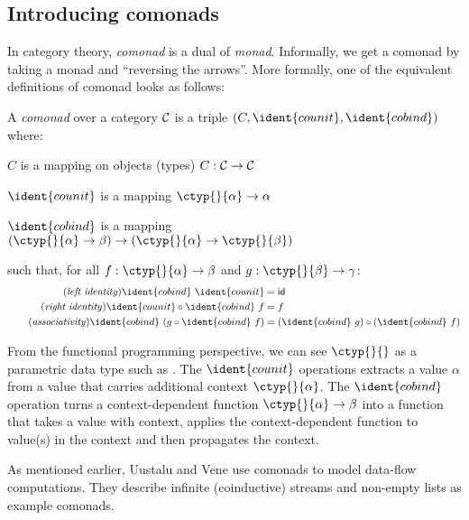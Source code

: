 
\subsection{Introducing comonads}

In category theory, \emph{comonad} is a dual of \emph{monad}. Informally, we get a comonad by 
taking a monad and ``reversing the arrows''. More formally, one of the equivalent definitions of
comonad looks as follows:

\begin{definition}
A \emph{comonad} over a category $\mathcal{C}$ is a triple $(C, \ident{counit}, \ident{cobind})$ where:
\begin{compactitem}
\item $C$ is a mapping on objects (types) $C : \mathcal{C} \rightarrow \mathcal{C}$
\item $\ident{counit}$ is a mapping $\ctyp{}{\alpha} \rightarrow \alpha$ 
\item $\ident{cobind}$ is a mapping $(\ctyp{}{\alpha} \rightarrow \beta) 
  \rightarrow (\ctyp{}{\alpha} \rightarrow \ctyp{}{\beta})$
\end{compactitem}
such that, for all $f:\ctyp{}{\alpha} \rightarrow \beta$ and $g:\ctyp{}{\beta} \rightarrow \gamma$:
\begin{align}
\tag{\emph{left identity}}
  \ident{cobind}~\ident{counit} &= \idf{}
  \\
\tag{\emph{right identity}}
  \ident{counit} \circ \ident{cobind}~f &= f
  \\
\tag{\emph{associativity}}
  \ident{cobind}~(g \circ \ident{cobind}~f) &= (\ident{cobind}~g) \circ (\ident{cobind}~f)
\end{align}
\end{definition}

\noindent
From the functional programming perspective, we can see $\ctyp{}{}$ as a parametric data type such as
. The $\ident{counit}$ operations extracts a value $\alpha$ from a value that carries 
additional context $\ctyp{}{\alpha}$. The $\ident{cobind}$ operation turns a context-dependent function 
$\ctyp{}{\alpha} \rightarrow \beta$ into a function that takes a value with context, applies
the context-dependent function to value(s) in the context and then propagates the context.

As mentioned earlier, Uustalu and Vene \cite{comonads-notions} use comonads to model data-flow
computations. They describe infinite (coinductive) streams and non-empty lists as example comonads.

